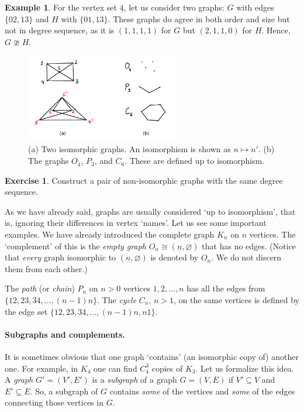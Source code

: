 \documentclass[12pt,notitlepage]{article}
\theoremstyle{plain}
\theoremstyle{definition}
\newtheorem{exc}[thm]{Exercise}
\newtheorem{exm}[thm]{Example}
\theoremstyle{plain}
\newcommand{\sbs}{\subseteq}
\newcommand{\void}{\varnothing}
\newcommand{\ul}[1]{\underline{#1}}
\newcommand{\1}{\mathbf{1}}
\newcommand{\0}{\mathbf{0}}
\begin{document}
\begin{exm}
For the vertex set $\ul{4}$, let us consider two graphs: $G$ with edges $\{02, 13\}$ and $H$ with $\{01, 13\}$. These graphs do agree in both order and size but not in degree sequence, as it is $(1,1,1,1)$ for $G$ but $(2,1,1,0)$ for $H$. Hence, $G \ncong H$.
\end{exm}

\begin{figure}[h]
\centering
\includegraphics*[width=0.6\textwidth]{graph_iso.pdf}
\caption{(a) Two isomorphic graphs. An isomorphism is shown as $n \mapsto n'$. (b) The graphs $O_4$, $P_3$, and $C_6$. These are defined up to isomorphism.}
\end{figure}

\begin{exc}
Construct a pair of non-isomorphic graphs with the same degree sequence.
\end{exc}

As we have already said, graphs are usually considered `up to isomorphism', that is, ignoring their differences in vertex `names'. Let us see some important examples. We have already introduced the complete graph $K_n$ on $n$ vertices. The `complement' of this is the \emph{empty graph} $O_n \cong (\ul{n}, \void)$ that has no edges. (Notice that \emph{every} graph isomorphic to $(\ul{n}, \void)$ is denoted by $O_n$. We do not discern them from each other.)

The \emph{path} (or \emph{chain}) $P_n$ on $n > 0$ vertices $1, 2, \ldots, n$ has all the edges from $\{1 2, 2 3, 3 4, \ldots, (n - 1) n\}$. The \emph{cycle} $C_n$, $n > 1$, on the same vertices is defined by the edge set $\{1 2, 2 3, 3 4, \ldots, (n - 1) n, n 1\}$.

\paragraph{Subgraphs and complements.} It is sometimes obvious that one graph `contains' (an isomorphic copy of) another one. For example, in $K_4$ one can find $C_4^3$ copies of $K_3$. Let us formalize this idea. A \emph{graph} $G' = (V', E')$ is a \emph{subgraph} of a graph $G = (V, E)$ if $V' \sbs V$ and $E' \sbs E$. So, a subgraph of $G$ contains \emph{some} of the vertices and \emph{some} of the edges connecting those vertices in $G$.
\end{document}

